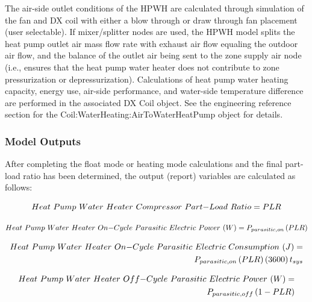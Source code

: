 The air-side outlet conditions of the HPWH are calculated through simulation of the fan and DX coil with either a blow through or draw through fan placement (user selectable). If mixer/splitter nodes are used, the HPWH model splits the heat pump outlet air mass flow rate with exhaust air flow equaling the outdoor air flow, and the balance of the outlet air being sent to the zone supply air node (i.e., ensures that the heat pump water heater does not contribute to zone pressurization or depressurization). Calculations of heat pump water heating capacity, energy use, air-side performance, and water-side temperature difference are performed in the associated DX Coil object. See the engineering reference section for the Coil:WaterHeating:AirToWaterHeatPump object for details.

\subsubsection{Model Outputs}\label{model-outputs-000}

After completing the float mode or heating mode calculations and the final part-load ratio has been determined, the output (report) variables are calculated as follows:

\begin{equation}
Heat~Pump~Water~Heater~Compressor~Part{\rm{ - }}Load~Ratio = PLR
\end{equation}

\begin{equation}
Heat~Pump~Water~Heater~On{\rm{ - }}Cycle~Parasitic~Electric~Power~(W) = {P_{parasitic,on}}\left( {PLR} \right)
\end{equation}

\begin{equation}
\begin{split}
Heat~Pump~Water~Heater~On{\rm{ - }}Cycle~Parasitic~Electric~Consumption~(J) = \\{P_{parasitic,on}}\left( {PLR} \right)\left( {3600} \right){t_{sys}}
\end{split}
\end{equation}

\begin{equation}
\begin{split}
Heat~Pump~Water~Heater~Off{\rm{ - }}Cycle~Parasitic~Electric~Power~(W) = \\{P_{parasitic,off}}\left( {1 - PLR} \right)
\end{split}
\end{equation}

